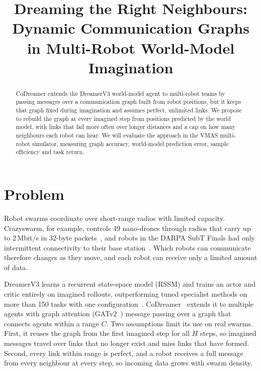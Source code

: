 \documentclass[conference]{IEEEtran}
\begin{document}
\title{Dreaming the Right Neighbours: Dynamic Communication Graphs\\ in Multi-Robot World-Model Imagination}

\author{
}

\maketitle

\begin{abstract}
CoDreamer extends the DreamerV3 world-model agent to multi-robot teams by passing messages over a communication graph built from robot positions, but it keeps that graph fixed during imagination and assumes perfect, unlimited links. We propose to rebuild the graph at every imagined step from positions predicted by the world model, with links that fail more often over longer distances and a cap on how many neighbours each robot can hear. We will evaluate the approach in the VMAS multi-robot simulator, measuring graph accuracy, world-model prediction error, sample efficiency and task return.
\end{abstract}

\section{Problem}
Robot swarms coordinate over short-range radios with limited capacity. Crazyswarm, for example, controls 49 nano-drones through radios that carry up to 2\,Mbit/s in 32-byte packets~\cite{preiss2017crazyswarm}, and robots in the DARPA SubT Finals had only intermittent connectivity to their base station~\cite{saboia2022achord}. Which robots can communicate therefore changes as they move, and each robot can receive only a limited amount of data.

DreamerV3 learns a recurrent state-space model (RSSM) and trains an actor and critic entirely on imagined rollouts, outperforming tuned specialist methods on more than 150 tasks with one configuration~\cite{hafner2025nature}. CoDreamer~\cite{toledo2024codreamer} extends it to multiple agents with graph attention (GATv2~\cite{brody2022gatv2}) message passing over a graph that connects agents within a range $C$. Two assumptions limit its use on real swarms. First, it reuses the graph from the first imagined step for all $H$ steps, so imagined messages travel over links that no longer exist and miss links that have formed. Second, every link within range is perfect, and a robot receives a full message from every neighbour at every step, so incoming data grows with swarm density.
\end{document}
